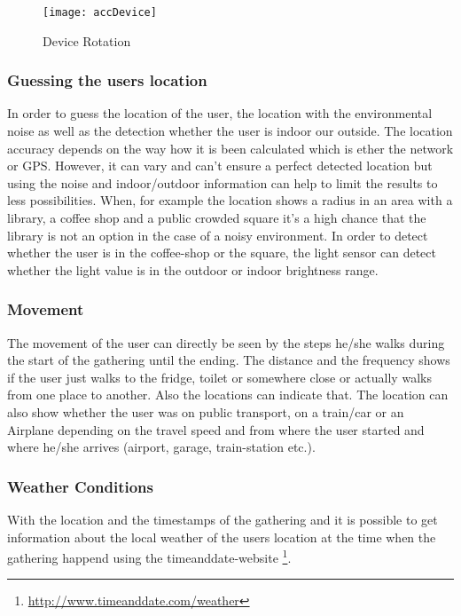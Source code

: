 {\begin{figure}[!htb]
\centering
\texttt{[image: accDevice]}
\caption{Device Rotation}\label{accDev}
\vspace{10 mm}
\end{figure}

\FloatBarrier

\subsubsection{Guessing the users location}
In order to guess the location of the user, the location with the environmental noise as well as the detection whether the user is indoor our outside. The location accuracy depends on the way how it is been calculated which is ether the network or GPS. However, it can vary and can't ensure a perfect detected location but using the noise and indoor/outdoor information can help to limit the results to less possibilities. When, for example the location shows a radius in an area with a library, a coffee shop and a public crowded square it's a high chance that the library is not an option in the case of a noisy environment. In order to detect whether the user is in the coffee-shop or the square, the light sensor can detect whether the light value is in the outdoor or indoor brightness range. 

\subsubsection{Movement}
The movement of the user can directly be seen by the steps he/she walks during the start of the gathering until the ending. The distance and the frequency shows if the user just walks to the fridge, toilet or somewhere close or actually walks from one place to another. Also the locations can indicate that. 
The location can also show whether the user was on public transport, on a train/car or an Airplane depending on the travel speed and from where the user started and where he/she arrives (airport, garage, train-station etc.). 

\subsubsection{Weather Conditions}
With the location and the timestamps of the gathering and it is possible to get information about the local weather of the users location at the time when the gathering happend using the timeanddate-website  \footnote{\url{http://www.timeanddate.com/weather}}.

}
